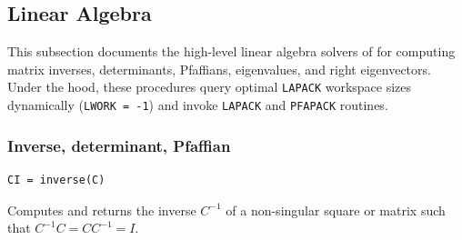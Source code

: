 \subsection{Linear Algebra}
\label{subsec:linear_algebra}

This subsection documents the high-level linear algebra solvers of  for computing matrix inverses, determinants, Pfaffians, eigenvalues, and right eigenvectors. Under the hood, these procedures query optimal \texttt{LAPACK} workspace sizes dynamically (\texttt{LWORK = -1}) and invoke \texttt{LAPACK} and \texttt{PFAPACK} routines.

\subsubsection{Inverse, determinant, Pfaffian}
\label{subsubsec:inv_det_pf}


\lstset{language=[95]Fortran}
\begin{lstlisting}
CI = inverse(C)
\end{lstlisting}

Computes and returns the inverse $C^{-1}$ of a non-singular square  or  matrix  such that $C^{-1} C = C C^{-1} = I$.

